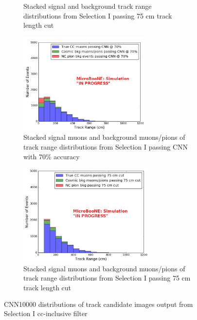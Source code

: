 \begin{figure}[htp!]
\begin{subfigure}[b]{.45\textwidth}
	\caption{Stacked signal and background track range distributions from Selection I passing 75 cm track length cut}
	\label{fig:sel1mod_stackedoriginal}
	\end{subfigure}
	\quad
	\begin{subfigure}[b]{.45\textwidth}
	\includegraphics[width=\textwidth, height=2in]{figs/sel1mod_cnn_trackrange_mupi_acc70_0707.png}
	\caption{Stacked signal muons and background muons/pions of track range distributions from Selection I passing CNN with 70\% accuracy}
	\label{fig:sel1mod_mupi_70stackedcnn}
	\end{subfigure}
	\quad
	\begin{subfigure}[b]{.45\textwidth}
	\includegraphics[width=\textwidth, height=2in]{figs/sel1mod_original_trackrange_mupi_acc70_0707.png}
	\caption{Stacked signal muons and background muons/pions of track range distributions from Selection I passing 75 cm track length cut}
	\label{fig:sel1mod_mupi_70stackedoriginal}
	\end{subfigure}
	\quad
\caption{CNN10000 distributions of track candidate images output from Selection I cc-inclusive filter}
\label{fig:sel1mod_CNN_dist}
\end{figure}



